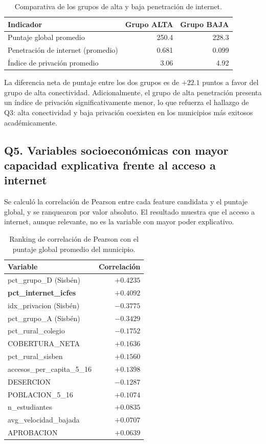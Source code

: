 \begin{table}[H]
\centering
\caption{Comparativa de los grupos de alta y baja penetración de internet.}
\begin{tabular}{l r r}
\toprule
\textbf{Indicador} & \textbf{Grupo ALTA} & \textbf{Grupo BAJA} \\
\midrule
Puntaje global promedio              & 250.4 & 228.3 \\
Penetración de internet (promedio)   & 0.681 & 0.099 \\
Índice de privación promedio         & 3.06  & 4.92  \\
\bottomrule
\end{tabular}
\end{table}

La diferencia neta de puntaje entre los dos grupos es de $+22.1$ puntos a favor del grupo de alta conectividad. Adicionalmente, el grupo de alta penetración presenta un índice de privación significativamente menor, lo que refuerza el hallazgo de Q3: alta conectividad y baja privación coexisten en los municipios más exitosos académicamente.

\subsection{Q5. Variables socioeconómicas con mayor capacidad explicativa frente al acceso a internet}
Se calculó la correlación de Pearson entre cada feature candidata y el puntaje global, y se ranquearon por valor absoluto. El resultado muestra que el acceso a internet, aunque relevante, no es la variable con mayor poder explicativo.

\begin{table}[H]
\centering
\caption{Ranking de correlación de Pearson con el puntaje global promedio del municipio.}
\begin{tabular}{l r}
\toprule
\textbf{Variable}                  & \textbf{Correlación} \\
\midrule
pct\_grupo\_D (Sisbén)             & $+0.4235$ \\
\textbf{pct\_internet\_icfes}      & $\mathbf{+0.4092}$ \\
idx\_privacion (Sisbén)            & $-0.3775$ \\
pct\_grupo\_A (Sisbén)             & $-0.3429$ \\
pct\_rural\_colegio                & $-0.1752$ \\
COBERTURA\_NETA                    & $+0.1636$ \\
pct\_rural\_sisben                 & $+0.1560$ \\
accesos\_per\_capita\_5\_16        & $+0.1398$ \\
DESERCION                          & $-0.1287$ \\
POBLACION\_5\_16                   & $+0.1074$ \\
n\_estudiantes                     & $+0.0835$ \\
avg\_velocidad\_bajada             & $+0.0707$ \\
APROBACION                         & $+0.0639$ \\
\bottomrule
\end{tabular}
\end{table}


